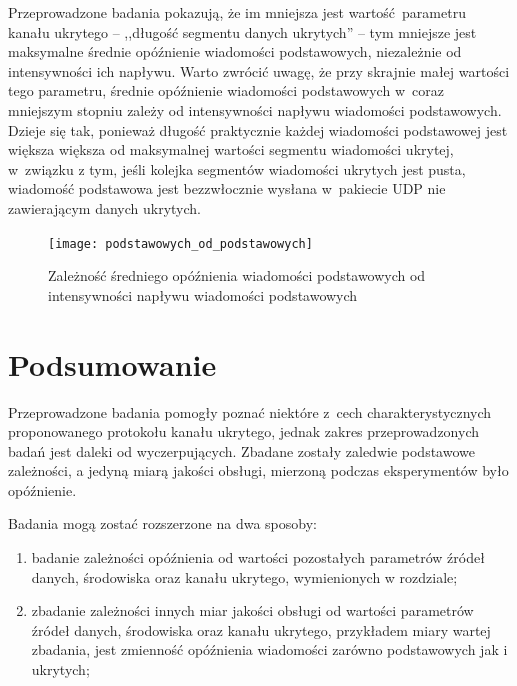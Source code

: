 \documentclass[a4paper, twoside, 12pt]{report}
\begin{document}
            Przeprowadzone badania pokazują, że im mniejsza jest wartość parametru
            kanału ukrytego -- ,,długość segmentu danych ukrytych'' -- tym mniejsze
            jest maksymalne średnie opóźnienie wiadomości podstawowych, niezależnie
            od intensywności ich napływu. Warto zwrócić uwagę, że przy skrajnie małej wartości tego
            parametru, średnie opóźnienie wiadomości podstawowych w~coraz mniejszym stopniu
            zależy od intensywności napływu wiadomości podstawowych. Dzieje się tak, ponieważ długość praktycznie
            każdej wiadomości podstawowej jest większa większa od maksymalnej wartości
            segmentu wiadomości ukrytej, w~związku z tym, jeśli
            kolejka segmentów wiadomości ukrytych jest pusta, wiadomość podstawowa jest
            bezzwłocznie wysłana w~pakiecie UDP nie zawierającym danych ukrytych.

        \begin{figure}[h]
                \centering
                \texttt{[image: podstawowych\_od\_podstawowych]}
                \caption{Zależność średniego opóźnienia wiadomości podstawowych od
                    intensywności napływu wiadomości podstawowych}
                \label{OPOZNIENIEPODSTAWOWYCHODPODSTAWOWYCH}
        \end{figure}

        \section{Podsumowanie}
        Przeprowadzone badania pomogły poznać niektóre z~cech charakterystycznych
        proponowanego protokołu kanału ukrytego, jednak zakres przeprowadzonych badań
        jest daleki od wyczerpujących. Zbadane
        zostały zaledwie podstawowe zależności, a jedyną miarą jakości obsługi,
        mierzoną podczas eksperymentów było opóźnienie.

        Badania mogą zostać rozszerzone na dwa sposoby:
        \begin{enumerate}
            \item badanie zależności opóźnienia od wartości pozostałych parametrów źródeł
                danych, środowiska oraz kanału ukrytego, wymienionych w rozdziale;
            \item zbadanie zależności innych miar jakości obsługi od wartości parametrów
                źródeł danych, środowiska oraz kanału ukrytego, przykładem miary
                wartej zbadania, jest zmienność opóźnienia wiadomości zarówno
                podstawowych jak i ukrytych;
            \end{enumerate}
\end{document}
